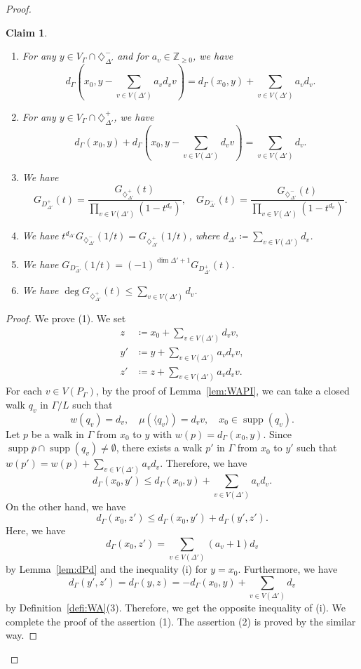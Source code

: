 \documentclass[10pt,a4paper]{amsart}
\theoremstyle{plain}
\newtheorem{claim}[cdrthm]{Claim}
\theoremstyle{definition}
\theoremstyle{remark}
\begin{document}
\begin{proof}
\begin{claim}
\begin{enumerate}
\item 
For any $y \in V_{\Gamma} \cap \diamondsuit^- _{\Delta '}$
and for $a_v \in \mathbb{Z}_{\ge 0}$, 
we have 
\[
d_{\Gamma} \left( x_0, y - \sum _{v \in V(\Delta ')} a_v d_v v \right) 
= d_{\Gamma} (x_0, y) + \sum _{v \in V(\Delta ')} a_v d_v. 
\]

\item
For any $y \in V_{\Gamma} \cap \diamondsuit^+ _{\Delta '}$, 
we have
\[
d_{\Gamma} (x_0, y) + d_{\Gamma} \left( x_0, y - \sum _{v \in V(\Delta ')} d_v v \right)
= \sum _{v \in V(\Delta ')} d_v.
\]

\item We have
\[
G_{D^+ _{\Delta '}}(t)
= \frac{G_{\diamondsuit ^+ _{\Delta '}}(t)}{\prod _{v \in V(\Delta ')} (1 - t^{d_v})}, \quad
G_{D^- _{\Delta '}}(t)
= \frac{G_{\diamondsuit ^- _{\Delta '}}(t)}{\prod _{v \in V(\Delta ')} (1 - t^{d_v})}. 
\]

\item
We have $t^{d_{\Delta '}} G_{\diamondsuit ^- _{\Delta '}}(1/t) 
= G_{\diamondsuit ^+ _{\Delta '}}(1/t)$, where 
$d_{\Delta '} \coloneqq  \sum _{v \in V(\Delta ')} d_v$.

\item
We have 
$G_{D^- _{\Delta '}}(1/t) = (-1)^{\dim \Delta ' +1}G_{D^+ _{\Delta '}}(t)$. 

\item
We have 
$\deg G_{\diamondsuit ^+ _{\Delta '}}(t) \le \sum _{v \in V(\Delta ')} d_v$. 
\end{enumerate}
\end{claim}
\begin{proof}
We prove (1). 
We set 
\begin{align*}
z &\coloneqq  x_0 + \sum _{v \in V(\Delta ')} d_v v, \\
y'&\coloneqq  y + \sum _{v \in V(\Delta ')} a_v d_v v, \\
z'&\coloneqq  z + \sum _{v \in V(\Delta ')} a_v d_v v. 
\end{align*}
For each $v \in V(P_{\Gamma})$, by the proof of Lemma~\ref{lem:WAPI},  
we can take a closed walk $q_v$ in $\Gamma /L$ such that 
\[
w(q_v) = d_v, \quad 
\mu(\langle q_v \rangle) = d_v v, \quad
x_0 \in \operatorname{supp}(q_v). 
\]
Let $p$ be a walk in $\Gamma$ from $x_0$ to $y$ with $w(p) = d_{\Gamma}(x_0, y)$. 
Since $\operatorname{supp}{\overline{p}} \cap \operatorname{supp}(q_v) \not = \emptyset$, 
there exists a walk $p'$ in $\Gamma$ from $x_0$ to $y'$ such that 
$w(p') = w(p) + \sum _{v \in V(\Delta ')} a_v d_v$. 
Therefore, we have
\[
d_{\Gamma} (x_0, y') 
\le d_{\Gamma} (x_0, y) + \sum _{v \in V(\Delta ')} a_v d_v. \tag{i}
\]
On the other hand, we have 
\[
d_{\Gamma} (x_0, z') \le d_{\Gamma} (x_0, y') + d_{\Gamma} (y', z'). 
\]
Here, we have 
\[
d_{\Gamma} (x_0, z') = \sum _{v \in V(\Delta ')} (a_v +1) d_v
\]
by Lemma~\ref{lem:dPd} and the inequality (i) for $y = x_0$. 
Furthermore, we have 
\[
d_{\Gamma} (y', z') = d_{\Gamma} (y, z) = -d_{\Gamma}(x_0, y) + \sum _{v \in V(\Delta ')} d_v
\]
by Definition~\ref{defi:WA}(3). 
Therefore, we get the opposite inequality of (i). 
We complete the proof of the assertion (1). 
The assertion (2) is proved by the similar way. 


\end{proof}
\end{proof}
\end{document}

